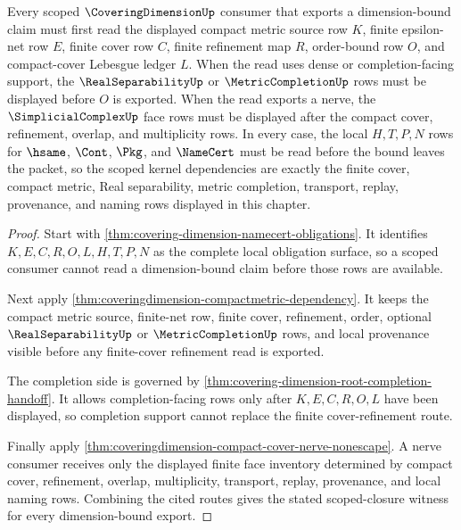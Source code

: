 \begin{theorem}
\label{thm:covering-dimension-scope-closure-witness}
Every scoped $\CoveringDimensionUp$ consumer that exports a dimension-bound claim must first read the displayed compact metric source row $K$, finite epsilon-net row $E$, finite cover row $C$, finite refinement map $R$, order-bound row $O$, and compact-cover Lebesgue ledger $L$. When the read uses dense or completion-facing support, the $\RealSeparabilityUp$ or $\MetricCompletionUp$ rows must be displayed before $O$ is exported. When the read exports a nerve, the $\SimplicialComplexUp$ face rows must be displayed after the compact cover, refinement, overlap, and multiplicity rows. In every case, the local $H,T,P,N$ rows for $\hsame$, $\Cont$, $\Pkg$, and $\NameCert$ must be read before the bound leaves the packet, so the scoped kernel dependencies are exactly the finite cover, compact metric, Real separability, metric completion, transport, replay, provenance, and naming rows displayed in this chapter.
\end{theorem}
\begin{proof}
Start with \autoref{thm:covering-dimension-namecert-obligations}. It identifies $K,E,C,R,O,L,H,T,P,N$ as the complete local obligation surface, so a scoped consumer cannot read a dimension-bound claim before those rows are available.

Next apply \autoref{thm:coveringdimension-compactmetric-dependency}. It keeps the compact metric source, finite-net row, finite cover, refinement, order, optional $\RealSeparabilityUp$ or $\MetricCompletionUp$ rows, and local provenance visible before any finite-cover refinement read is exported.

The completion side is governed by \autoref{thm:covering-dimension-root-completion-handoff}. It allows completion-facing rows only after $K,E,C,R,O,L$ have been displayed, so completion support cannot replace the finite cover-refinement route.

Finally apply \autoref{thm:coveringdimension-compact-cover-nerve-nonescape}. A nerve consumer receives only the displayed finite face inventory determined by compact cover, refinement, overlap, multiplicity, transport, replay, provenance, and local naming rows. Combining the cited routes gives the stated scoped-closure witness for every dimension-bound export.
\end{proof}

